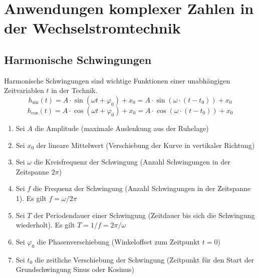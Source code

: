 \section{Anwendungen komplexer Zahlen in der Wechselstromtechnik}
\subsection{Harmonische Schwingungen}
Harmonische Schwingungen sind wichtige Funktionen einer unabhängigen Zeitvariablen $t$ in der Technik. 
\begin{equation}
\boxed{h_{\text{sin}}\left(t\right)=A\cdot \sin\left(\omega t+\varphi_0\right)+x_0=A\cdot \sin\left(\omega\cdot \left(t-t_0\right)\right)+x_0}
\end{equation}
\begin{equation}
\boxed{h_{\text{cos}}\left(t\right)=A\cdot \cos\left(\omega t+\varphi_0\right)+x_0=A\cdot \cos\left(\omega\cdot \left(t-t_0\right)\right)+x_0}
\end{equation}
\begin{enumerate}[$(a)$]
\item Sei $A$ die Amplitude (maximale Auslenkung aus der Ruhelage)
\item Sei $x_0$ der lineare Mittelwert (Verschiebung der Kurve in vertikaler Richtung)
\item Sei $\omega$ die Kreisfrequenz der Schwingung (Anzahl Schwingungen in der Zeitspanne $2\pi$)
\item Sei $f$ die Frequenz der Schwingung (Anzahl Schwingungen in der Zeitspanne 1). Es gilt $f=\omega/2\pi$
\item Sei $T$ der Periodendauer einer Schwingung (Zeitdauer bis sich die Schwingung wiederholt). Es gilt $T=1/f=2\pi/\omega$
\item Sei $\varphi_0$ die Phasenverschiebung (Winkeloffset zum Zeitpunkt $t=0$)
\item Sei $t_0$ die zeitliche Verschiebung der Schwingung (Zeitpunkt für den Start der Grundschwingung Sinus oder Kosinus) 
\end{enumerate}
